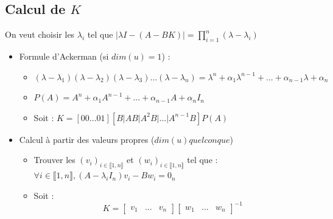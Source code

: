 \subsection{Calcul de $K$}
On veut choisir les $\lambda_{i}$ tel que $|\lambda I - (A - BK)| = \prod_{i=1}^{n}(\lambda - \lambda_{i})$ \newline
\begin{itemize}
    \item \textcolor{BrickRed}{Formule d'Ackerman} (si $dim(u) = 1$) : \newline
    \begin{itemize}
        \item \Large{$
            (\lambda - \lambda_{1})(\lambda - \lambda_{2})(\lambda - \lambda_{3})...(\lambda - \lambda_{n}) = \lambda^{n} + \alpha_{1}\lambda^{n-1} + ... + \alpha_{n-1}\lambda + \alpha_{n}
            $} \newline
        \item \Large{$
        P(A) = A^{n} + \alpha_{1}A^{n-1} + ... + \alpha_{n-1}A + \alpha_{n}I_{n} 
        $} \newline
        \item Soit : \newline
        \Large{$
        K = [ 0  0  ...  0  1 ][B | AB | A^{2}B | ... | A^{n-1}B]P(A)
        $} \newline
    \end{itemize}
    \item \textcolor{BrickRed}{Calcul à partir des valeurs propres} ($dim(u) quelconque$) \newline
    \begin{itemize}
        \item Trouver les $(v_{i})_{i \in \llbracket 1 , n \rrbracket}$ et $(w_{i})_{i \in \llbracket 1 , n \rrbracket}$ tel que : \newline
        \Large{$
        \forall i \in \llbracket 1 , n \rrbracket , (A - \lambda_{i}I_{n})v_{i} - Bw_{i} = 0_{n}
        $} \newline
        \item Soit : 
    \[K = 
    \begin{bmatrix}
        v_{1} & ... & v_{n}
    \end{bmatrix}
    \begin{bmatrix}
        w_{1} & ... & w_{n}
    \end{bmatrix}
    ^{-1}\]
    \end{itemize}
\end{itemize}
